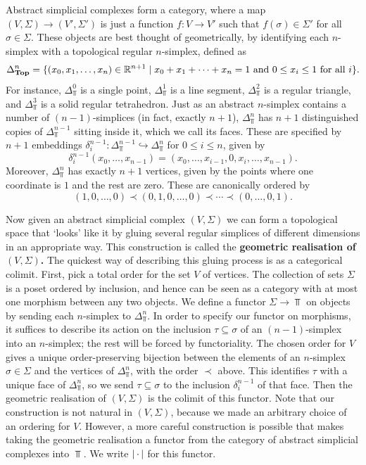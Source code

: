 Abstract simplicial complexes form a category, where a map $(V,\Sigma) \to (V', \Sigma')$ is just a function $f : V \to V'$ such that $f(\sigma) \in \Sigma'$ for all $\sigma \in \Sigma$. These objects are best thought of geometrically, by identifying each $n$-simplex with a topological regular $n$-simplex, defined as
\[\Delta^n_{\mathbf{Top}} = \{(x_0,x_1,\dots,x_n) \in \mathbb{R}^{n+1} \mid x_0 + x_1 + \cdots + x_n = 1 \text{ and } 0 \leq x_i \leq 1 \text{ for all } i\}.\]
For instance, $\Delta^0_\Top$ is a single point, $\Delta^1_\Top$ is a line segment, $\Delta^2_\Top$ is a regular triangle, and $\Delta^3_\Top$ is a solid regular tetrahedron. Just as an abstract $n$-simplex contains a number of $(n-1)$-simplices (in fact, exactly $n+1$), $\Delta^n_\Top$ has $n+1$ distinguished copies of $\Delta^{n-1}_\Top$ sitting inside it, which we call its faces. These are specified by $n+1$ embeddings $\delta_i^{n-1} : \Delta^{n-1}_\Top \hookrightarrow \Delta^n_\Top$ for $0 \leq i \leq n$, given by
\[\delta_i^{n-1}(x_0,\dots,x_{n-1}) = (x_0,\dots,x_{i-1},0,x_i,\dots,x_{n-1}).\]
Moreover, $\Delta^n_\Top$ has exactly $n+1$ vertices, given by the points where one coordinate is $1$ and the rest are zero. These are canonically ordered by $$(1,0,\dots,0) \prec (0,1,0,\dots,0) \prec \cdots \prec (0,\dots,0,1).$$

Now given an abstract simplicial complex $(V,\Sigma)$ we can form a topological space that `looks' like it by gluing several regular simplices of different dimensions in an appropriate way. This construction is called the \textbf{geometric realisation of $(V,\Sigma)$.} The quickest way of describing this gluing process is as a categorical colimit. First, pick a total order for the set $V$ of vertices. The collection of sets $\Sigma$ is a poset ordered by inclusion, and hence can be seen as a category with at most one morphism between any two objects. We define a functor $\Sigma \to \Top$ on objects by sending each $n$-simplex to $\Delta^n_\Top$. In order to specify our functor on morphisms, it suffices to describe its action on the inclusion $\tau \subseteq \sigma$ of an $(n-1)$-simplex into an $n$-simplex; the rest will be forced by functoriality. The chosen order for $V$ gives a unique order-preserving bijection between the elements of an $n$-simplex $\sigma \in \Sigma$ and the vertices of $\Delta^n_\Top$, with the order $\prec$ above. This identifies $\tau$ with a unique face of $\Delta^n_\Top$, so we send $\tau \subseteq \sigma$ to the inclusion $\delta^{n-1}_i$ of that face. Then the geometric realisation of $(V,\Sigma)$ is the colimit of this functor. Note that our construction is not natural in $(V,\Sigma)$, because we made an arbitrary choice of an ordering for $V$. However, a more careful construction is possible that makes taking the geometric realisation a functor from the category of abstract simplicial complexes into $\Top$. We write $\lvert\,\cdot\,\rvert$ for this functor.

